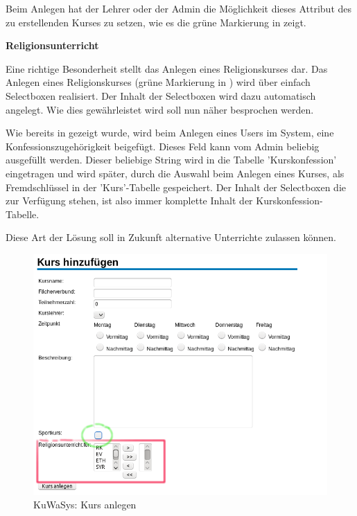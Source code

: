 Beim Anlegen hat der Lehrer oder der Admin die Möglichkeit dieses Attribut des zu erstellenden Kurses zu setzen, wie es die grüne Markierung in  zeigt.


\textbf{Religionsunterricht}

Eine richtige Besonderheit stellt das Anlegen eines Religionskurses dar.
Das Anlegen eines Religionskurses (grüne Markierung in ) wird über einfach Selectboxen realisiert. Der Inhalt der Selectboxen wird dazu automatisch angelegt. Wie dies gewährleistet wird soll nun näher besprochen werden.

Wie bereits in  gezeigt wurde, wird beim Anlegen eines Users im System, eine Konfessionszugehörigkeit beigefügt. Dieses Feld kann vom Admin beliebig ausgefüllt werden. 
Dieser beliebige String wird in die Tabelle 'Kurskonfession' eingetragen und wird später, durch die Auswahl beim Anlegen eines Kurses, als Fremdschlüssel in der 'Kurs'-Tabelle gespeichert.
Der Inhalt der Selectboxen die zur Verfügung stehen, ist also immer komplette Inhalt der Kurskonfession-Tabelle.




Diese Art der Lösung soll in Zukunft alternative Unterrichte zulassen können.

\begin{figure}[H]
 \begin{center}
   \includegraphics[scale=0.6]{img/KursAnlegen_KuWaSys.png}
 \end{center}
 \caption[\textbf{KuWaSys: Kurs anlegen}]{KuWaSys: Kurs anlegen}
 \label{fig:KursAnlegen_KuWaSys}
\end{figure}

